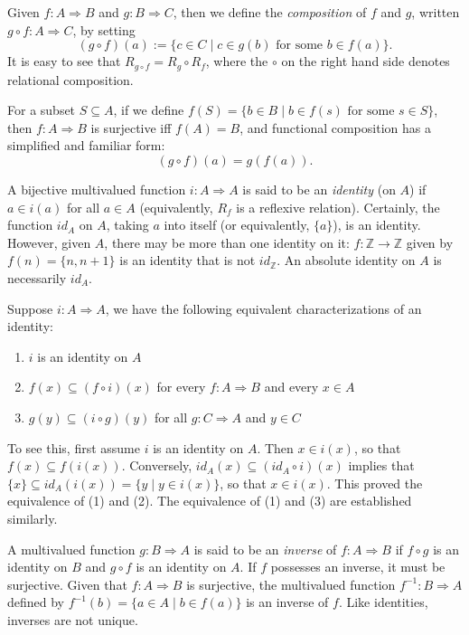 \documentclass[12pt]{article}
\begin{document}
Given $f:A\Rightarrow B$ and $g:B\Rightarrow C$, then we define the \emph{composition} of $f$ and $g$, written $g\circ f:A\Rightarrow C$, by setting $$(g\circ f)(a):=\lbrace c\in C\mid c\in g(b)\mbox{ for some }b\in f(a)\rbrace.$$
It is easy to see that $R_{g\circ f}=R_g\circ R_f$, where the $\circ$ on the right hand side denotes relational composition.

For a subset $S\subseteq A$, if we define $f(S)=\lbrace b\in B\mid b\in f(s)\mbox{ for some }s\in S\rbrace$, then $f:A\Rightarrow B$ is surjective iff $f(A)=B$, and functional composition has a simplified and familiar form: $$(g\circ f)(a)=g(f(a)).$$

A bijective multivalued function $i:A\Rightarrow A$ is said to be an \emph{identity} (on $A$) if $a\in i(a)$ for all $a\in A$ (equivalently, $R_f$ is a reflexive relation).  Certainly, the function $id_A$ on $A$, taking $a$ into itself (or equivalently, $\lbrace a\rbrace$), is an identity.  However, given $A$, there may be more than one identity on it: $f:\mathbb{Z}\to \mathbb{Z}$ given by $f(n)=\lbrace n,n+1\rbrace$ is an identity that is not $id_{\mathbb{Z}}$.  An absolute identity on $A$ is necessarily $id_A$.

Suppose $i:A\Rightarrow A$, we have the following equivalent characterizations of an identity:
\begin{enumerate}
\item $i$ is an identity on $A$
\item $f(x)\subseteq (f\circ i)(x)$ for every $f:A\Rightarrow B$ and every $x\in A$
\item $g(y)\subseteq (i\circ g)(y)$ for all $g:C\Rightarrow A$ and $y\in C$
\end{enumerate}
To see this, first assume $i$ is an identity on $A$.  Then $x\in i(x)$, so that $f(x)\subseteq f(i(x))$.  Conversely, $id_A(x)\subseteq (id_A\circ i)(x)$ implies that $\lbrace x\rbrace \subseteq id_A(i(x)) = \lbrace y\mid y\in i(x)\rbrace$, so that $x\in i(x)$.  This proved the equivalence of (1) and (2).  The equivalence of (1) and (3) are established similarly.

A multivalued function $g:B\Rightarrow A$ is said to be an \emph{inverse} of $f:A\Rightarrow B$ if $f\circ g$ is an identity on $B$ and $g\circ f$ is an identity on $A$.  If $f$ possesses an inverse, it must be surjective.  Given that $f:A\Rightarrow B$ is surjective, the multivalued function $f^{-1}: B\Rightarrow A$ defined by $f^{-1}(b)=\lbrace a\in A\mid b\in f(a)\rbrace$ is an inverse of $f$.  Like identities, inverses are not unique.
\end{document}

